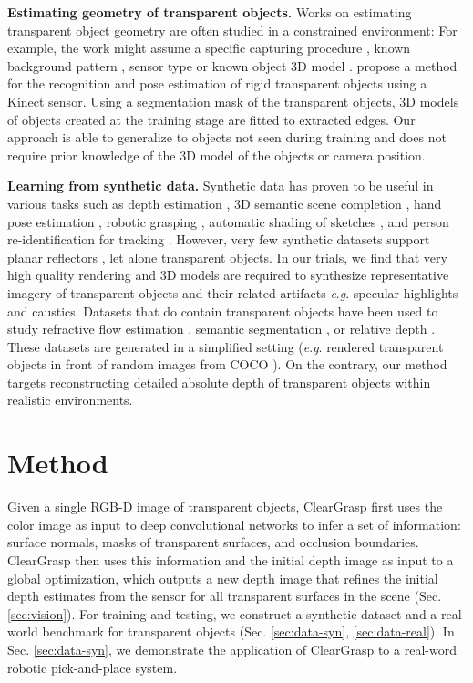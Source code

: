 \documentclass[letterpaper, 10 pt, conference]{ieeeconf}
\newcommand{\myparagraph}[1]{\vspace{0.03in}\noindent\textbf{#1}}
\newcommand{\eg}{\textit{e}.\textit{g}. }
\begin{document}
\myparagraph{Estimating geometry of transparent objects.}
Works on estimating transparent object geometry are often studied in a constrained environment: 
For example, the work might assume a specific capturing procedure \cite{guo2019transparent, ji2017fusing, albrecht2013seeing}, known background pattern \cite{Qian_2016_CVPR, han2015fixed}, sensor type \cite{song2018depth} or known object 3D model \cite{phillips2016seeing, lysenkov2013pose, klank2011transparent}. \citet{lysenkov2013recognition} propose a method for the recognition and pose estimation of rigid transparent objects using a Kinect sensor. Using a segmentation mask of the transparent objects, 3D models of objects created at the training stage are fitted to extracted edges. Our approach is able to generalize to objects not seen during training and does not require prior knowledge of the 3D model of the objects or camera position. 

\myparagraph{Learning from synthetic data.}
Synthetic data has proven to be useful in various tasks such as depth estimation \cite{rematas2018soccer}, 3D semantic scene completion \cite{song2016ssc}, hand pose estimation \cite{deng2017handpose}, robotic grasping \cite{mahler2017dex}, automatic shading of sketches \cite{Hudon_2018_ECCV_Workshops}, and person re-identification for tracking \cite{Barbosa2018tracking}.
However, very few synthetic datasets support planar reflectors \cite{replica19arxiv}, let alone transparent objects. In our trials, we find that very high quality rendering and 3D models are required to synthesize representative imagery of transparent objects and their related artifacts \eg specular highlights and caustics.
Datasets that do contain transparent objects have been used to study refractive flow estimation \citet{chen2018tomnet}, semantic segmentation \cite{stets2019materialbased}, or relative depth \cite{stets2019single}.
These datasets are generated in a simplified setting (\eg rendered transparent objects in front of random images from COCO \cite{lin2014microsoft}). On the contrary, our method targets reconstructing detailed absolute depth of transparent objects within realistic environments.



\section{Method}
\label{sec:method}
Given a single RGB-D image of transparent objects, ClearGrasp first uses the color image as input to deep convolutional networks to infer a set of information: surface normals, masks of transparent surfaces, and occlusion boundaries. ClearGrasp then uses this information and the initial depth image as input to a global optimization, which outputs a new depth image that refines the initial depth estimates from the sensor for all transparent surfaces in the scene (Sec. \ref{sec:vision}).
For training and testing, we construct a synthetic dataset and a real-world benchmark for transparent objects (Sec. \ref{sec:data-syn}, \ref{sec:data-real}).
In Sec. \ref{sec:data-syn}, we demonstrate the application of ClearGrasp to a real-word robotic pick-and-place system.
\end{document}

